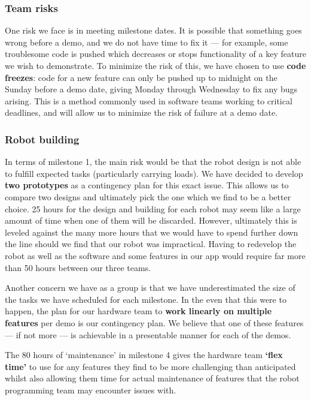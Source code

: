 \documentclass{article}
\begin{document}
\subsubsection{Team risks}

One risk we face is in meeting milestone dates. It is possible that something goes wrong before a demo, and we do not have time to fix it --- for example, some troublesome code is pushed which decreases or stops functionality of a key feature we wish to demonstrate. To minimize the risk of this, we have chosen to use {\bf code freezes}: code for a new feature can only be pushed up to midnight on the Sunday before a demo date, giving Monday through Wednesday to fix any bugs arising. This is a method commonly used in software teams working to critical deadlines, and will allow us to minimize the risk of failure at a demo date.


\subsubsection{Robot building}

In terms of milestone 1, the main risk would be that the robot design is not able to fulfill expected tasks (particularly carrying loads). We have decided to develop {\bf two prototypes} as a contingency plan for this exact issue. This allows us to compare two designs and ultimately pick the one which we find to be a better choice. 25 hours for the design and building for each robot may seem like a large amount of time when one of them will be discarded. However, ultimately this is leveled against the many more hours that we would have to spend further down the line should we find that our robot was impractical. Having to redevelop the robot as well as the software and some features in our app would require far more than 50 hours between our three teams.

Another concern we have as a group is that we have underestimated the size of the tasks we have scheduled for each milestone. In the even that this were to happen, the plan for our hardware team to {\bf work linearly on multiple features} per demo is our contingency plan. We believe that one of these features --- if not more --- is achievable in a presentable manner for each of the demos.

The 80 hours of `maintenance' in milestone 4 gives the hardware team {\bf `flex time'} to use for any features they find to be more challenging than anticipated whilst also allowing them time for actual maintenance of features that the robot programming team may encounter issues with.
\end{document}
